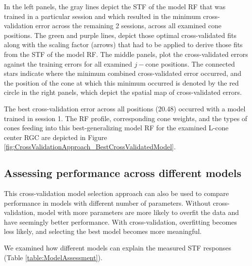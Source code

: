\documentclass[11pt, oneside]{article}   	%
\begin{document}
In the left panels, the gray lines depict the STF of the model RF that was trained in a particular session and which resulted in the minimum cross-validation error across the remaining 2 sessions, across all examined cone positions. The green and purple lines, depict those optimal cross-validated fits along with the scaling factor (arrows) that had to be applied to derive those fits from the STF of the model RF. The middle panels, plot the cross-validated errors against the training errors for all examined $j-$cone positions. The connected stars indicate where the minimum combined cross-validated error occurred, and the position of the cone at which this minimum occurred is denoted by the red circle in the right panels, which depict the spatial map of cross-validated errors.

The best cross-validation error across all positions (20.48) occurred with a model trained in session 1. The RF profile, corresponding cone weights, and the types of cones feeding into this best-generalizing model RF for the examined L-cone center RGC are depicted in Figure \ref{fig:CrossValidationApproach_BestCrossValidatedModel}.



\subsection{Assessing performance across different models}
This cross-validation model selection approach can also be used to compare performance in models with different number of parameters. Without cross-validation, model with more parameters are more likely to overfit the data and have seemingly better performance. With cross-validation, overfitting becomes less likely, and selecting the best model becomes more meaningful. 

We examined how different models can explain the measured STF responses (Table \ref{table:ModelAssessment}).
\end{document}
